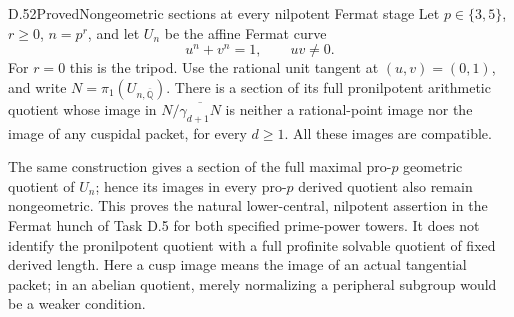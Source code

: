\begin{statement}{D.52}{Proved}{Nongeometric sections at every nilpotent Fermat stage}
Let \(p\in\{3,5\}\), \(r\ge0\), \(n=p^r\),
and let \(U_n\) be the affine Fermat curve
\[
             u^n+v^n=1,\qquad uv\ne0 .
\]
For \(r=0\) this is the tripod.
Use the rational unit tangent at \((u,v)=(0,1)\),
and write \(N=\pi_1(U_{n,\overline{\mathbb Q}})\).
There is a section of its full pronilpotent
arithmetic quotient whose image in
\(N/\overline{\gamma_{d+1}N}\) is neither a
rational-point image nor the image of any
cuspidal packet, for every \(d\ge1\).
All these images are compatible.

The same construction gives a section of
the full maximal pro-\(p\) geometric quotient
of \(U_n\); hence its images in every
pro-\(p\) derived quotient also remain
nongeometric. This proves the natural
lower-central, nilpotent assertion in the
Fermat hunch of Task D.5 for both specified
prime-power towers. It does not identify the
pronilpotent quotient with a full profinite
solvable quotient of fixed derived length.
Here a cusp image means the image of an
actual tangential packet; in an abelian
quotient, merely normalizing a peripheral
subgroup would be a weaker condition.
\end{statement}


